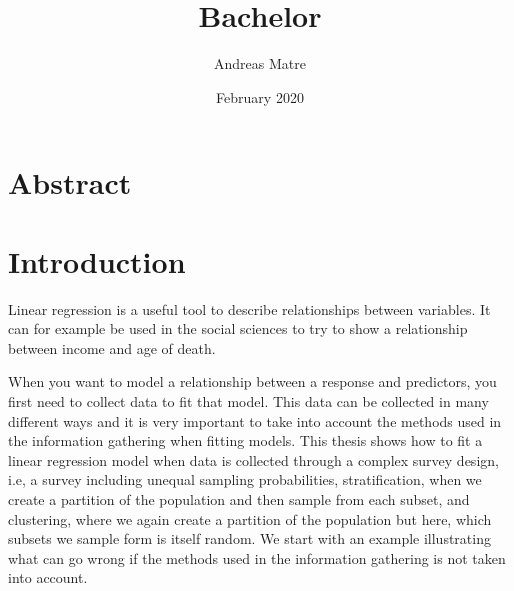 \documentclass{article}
\title{Bachelor}
\author{Andreas Matre}
\date{February 2020}
\begin{document}
\newtheorem{definition}{Definition}[subsection]
\newtheorem{theorem}{Theorem}
\newtheorem{example}{Example}[section]


\maketitle

\section{Abstract}

\tableofcontents

\section{Introduction}

Linear regression is a useful tool to describe relationships between variables.
It can for example be used in the social sciences to try to show a relationship
between income and age of death. 

When you want to model a relationship between a response and predictors, you
first need to collect data to fit that model. This data can be collected in many
different ways and it is very important to take into account the methods used in
the information gathering when fitting models. This thesis shows how to fit
a linear regression model when data is collected through a complex survey design, i.e,
a survey including unequal sampling probabilities, stratification, when we
create a partition of the population and then sample from each subset, and
clustering, where we again create a partition of the population but here, which
subsets we sample form is itself random. We start
with an example illustrating what can go wrong if the methods used in the
information gathering is not taken into account.
\end{document}
